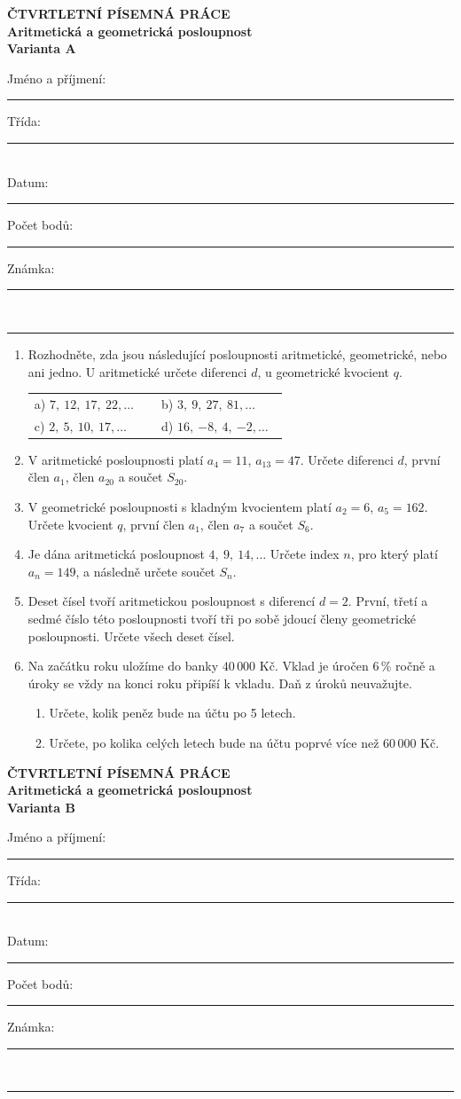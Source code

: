 \documentclass[a4paper,11pt]{article}
\newcommand{\TestTitle}{Aritmetická a geometrická posloupnost}
\newcommand{\TestHeader}[1]{%
    \begin{center}
        {\Large\bfseries ČTVRTLETNÍ PÍSEMNÁ PRÁCE}\\[2mm]
        {\bfseries \TestTitle}\\[1mm]
        {\bfseries Varianta #1}
    \end{center}
    \vspace{2mm}
    Jméno a příjmení: \rule{9cm}{0.4pt}\hfill Třída: \rule{2cm}{0.4pt}\\[3mm]
    Datum: \rule{3cm}{0.4pt}\hfill Počet bodů: \rule{2cm}{0.4pt}\hfill Známka: \rule{2cm}{0.4pt}\\[2mm]
    \hrule\vspace{4mm}
}
\newcommand{\AnswerSpace}[1]{\vspace{#1}}
\begin{document}
\TestHeader{A}

\begin{enumerate}
    \item Rozhodněte, zda jsou následující posloupnosti aritmetické,
    geometrické, nebo ani jedno. U aritmetické určete diferenci $d$,
    u geometrické kvocient $q$.

    \begin{tabular}{@{}p{0.47\linewidth}p{0.47\linewidth}@{}}
        a) $7,\ 12,\ 17,\ 22,\ldots$ & b) $3,\ 9,\ 27,\ 81,\ldots$ \\[5mm]
        c) $2,\ 5,\ 10,\ 17,\ldots$ & d) $16,\ {-8},\ 4,\ {-2},\ldots$
    \end{tabular}
    \AnswerSpace{4mm}

    \item V aritmetické posloupnosti platí $a_4=11$, $a_{13}=47$.
    Určete diferenci $d$, první člen $a_1$, člen $a_{20}$ a součet $S_{20}$.
    \AnswerSpace{19mm}

    \item V geometrické posloupnosti s kladným kvocientem platí
    $a_2=6$, $a_5=162$. Určete kvocient $q$, první člen $a_1$,
    člen $a_7$ a součet $S_6$.
    \AnswerSpace{20mm}

    \item Je dána aritmetická posloupnost $4,\ 9,\ 14,\ldots$
    Určete index $n$, pro který platí $a_n=149$, a následně určete součet $S_n$.
    \AnswerSpace{17mm}

    \item Deset čísel tvoří aritmetickou posloupnost s diferencí $d=2$.
    První, třetí a sedmé číslo této posloupnosti tvoří tři po sobě jdoucí
    členy geometrické posloupnosti. Určete všech deset čísel.
    \AnswerSpace{24mm}

    \item Na začátku roku uložíme do banky $40\,000$ Kč. Vklad je úročen
    $6\,\%$ ročně a úroky se vždy na konci roku připíší k vkladu.
    Daň z úroků neuvažujte.
    \begin{enumerate}[label=\alph*),topsep=1pt,itemsep=1pt]
        \item Určete, kolik peněz bude na účtu po 5 letech.
        \item Určete, po kolika celých letech bude na účtu poprvé více
        než $60\,000$ Kč.
    \end{enumerate}
    \AnswerSpace{20mm}
\end{enumerate}

\newpage
\TestHeader{B}
\end{document}
